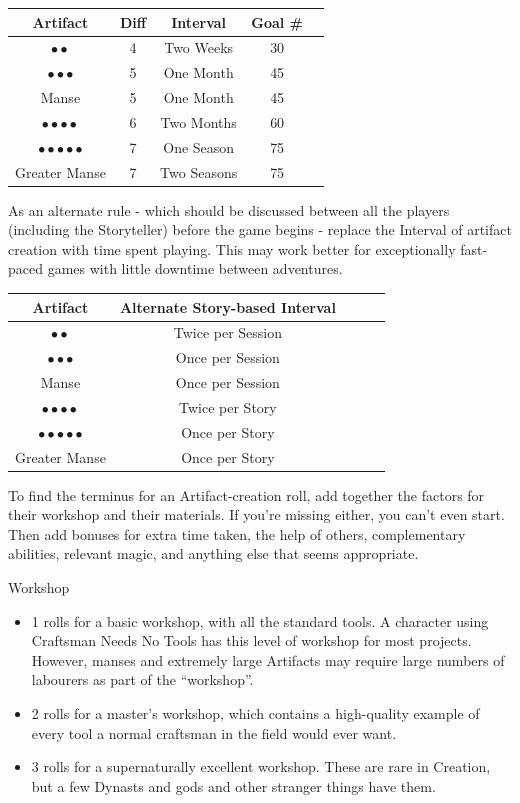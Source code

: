 \documentclass[oneside]{book}
\begin{document}
\begin{multicols}{2}
  \begin{tabular}{ccccc}
    Artifact & Diff & Interval & Goal \# \\
  \hline
    \(\bullet\bullet\) & 4 & Two Weeks & 30 \\
    \(\bullet\bullet\bullet\) & 5 & One Month & 45 \\
    Manse & 5 & One Month & 45\\
    \(\bullet\bullet\bullet\bullet\) & 6 & Two Months & 60 \\
    \(\bullet\bullet\bullet\bullet\bullet\) & 7 & One Season & 75 \\
    Greater Manse & 7 & Two Seasons & 75 \\
  \end{tabular}

  \par As an alternate rule - which should be discussed between all the players (including the Storyteller) before the game begins - replace the Interval of artifact creation with time spent playing. This may work better for exceptionally fast-paced games with little downtime between adventures.

  \begin{tabular}{ccccc}
    Artifact & Alternate Story-based Interval \\
  \hline
    \(\bullet\bullet\) & Twice per Session \\
    \(\bullet\bullet\bullet\) & Once per Session \\
    Manse & Once per Session \\
    \(\bullet\bullet\bullet\bullet\) & Twice per Story \\
    \(\bullet\bullet\bullet\bullet\bullet\) & Once per Story \\
    Greater Manse & Once per Story \\
  \end{tabular}

  \par To find the terminus for an Artifact-creation roll, add together the factors for their workshop and their materials. If you're missing either, you can't even start. Then add bonuses for extra time taken, the help of others, complementary abilities, relevant magic, and anything else that seems appropriate.

  Workshop
  \begin{itemize}
    \item 1 rolls for a basic workshop, with all the standard tools. A character using Craftsman Needs No Tools has this level of workshop for most projects. However, manses and extremely large Artifacts may require large numbers of labourers as part of the “workshop”.
    \item 2 rolls for a master's workshop, which contains a high-quality example of every tool a normal craftsman in the field would ever want.
    \item 3 rolls for a supernaturally excellent workshop. These are rare in Creation, but a few Dynasts and gods and other stranger things have them.
  \end{itemize}


\end{multicols}
\end{document}
